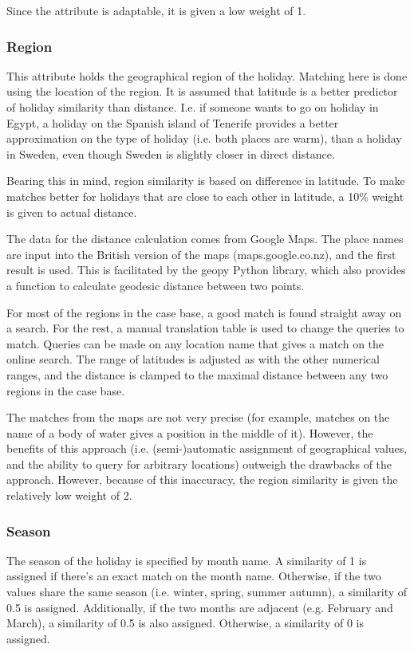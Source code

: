 \documentclass[a4paper,11pt]{scrartcl}
\begin{document}
Since the attribute is adaptable, it is given a low weight of 1.

\subsubsection{Region}
This attribute holds the geographical region of the holiday. Matching
here is done using the location of the region. It is assumed that
latitude is a better predictor of holiday similarity than distance.
I.e. if someone wants to go on holiday in Egypt, a holiday on the
Spanish island of Tenerife provides a better approximation on the type
of holiday (i.e. both places are warm), than a holiday in Sweden, even
though Sweden is slightly closer in direct distance.

Bearing this in mind, region similarity is based on difference in
latitude. To make matches better for holidays that are close to each
other in latitude, a 10\% weight is given to actual distance.

The data for the distance calculation comes from Google Maps. The
place names are input into the British version of the maps
(maps.google.co.nz), and the first result is used. This is facilitated
by the geopy Python library, which also provides a function to
calculate geodesic distance between two points.

For most of the regions in the case base, a good match is found
straight away on a search. For the rest, a manual translation table is
used to change the queries to match. Queries can be made on any
location name that gives a match on the online search. The range of
latitudes is adjusted as with the other numerical ranges, and the
distance is clamped to the maximal distance between any two regions in
the case base.

The matches from the maps are not very precise (for example, matches
on the name of a body of water gives a position in the middle of it).
However, the benefits of this approach (i.e. (semi-)automatic
assignment of geographical values, and the ability to query for
arbitrary locations) outweigh the drawbacks of the approach. However,
because of this inaccuracy, the region similarity is given the
relatively low weight of 2.

\subsubsection{Season}
The season of the holiday is specified by month name. A similarity of
1 is assigned if there's an exact match on the month name. Otherwise,
if the two values share the same season (i.e. winter, spring, summer
autumn), a similarity of 0.5 is assigned. Additionally, if the two
months are adjacent (e.g. February and March), a similarity of 0.5 is
also assigned. Otherwise, a similarity of 0 is assigned.
\end{document}
